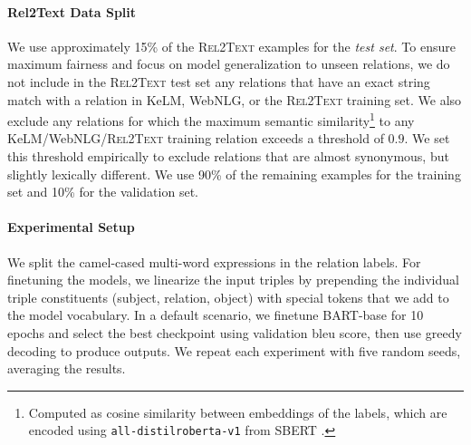 \paragraph{Rel2Text Data Split} We use approximately 15\% of the \textsc{Rel2Text} examples for the \emph{test set}. To ensure maximum fairness and focus on model generalization to unseen relations, we do not include in the \textsc{Rel2Text} test set any relations that have an exact string match with a relation in KeLM, WebNLG, or the \textsc{Rel2Text} training set. We also exclude any relations for which the maximum semantic similarity\footnote{Computed as cosine similarity between embeddings of the labels, which are encoded using \texttt{all-distilroberta-v1} from SBERT \cite{reimers-gurevych-2019-sentence}.} to any KeLM/WebNLG/\textsc{Rel2Text} training relation exceeds a threshold of $0.9$. We set this threshold empirically to exclude relations that are almost synonymous, but slightly lexically different.
We use 90\% of the remaining examples for the training set and 10\% for the validation set.

\paragraph{Experimental Setup} We split the camel-cased multi-word expressions in the relation labels. For finetuning the models, we linearize the input triples by prepending the individual triple constituents (subject, relation, object) with special tokens that we add to the model vocabulary. In a default scenario, we finetune BART-base \cite{lewisBARTDenoisingSequencetoSequence2019} for 10 epochs and select the best checkpoint using validation \acs{bleu} score, then use greedy decoding to produce outputs. We repeat each experiment with five random seeds, averaging the results.



